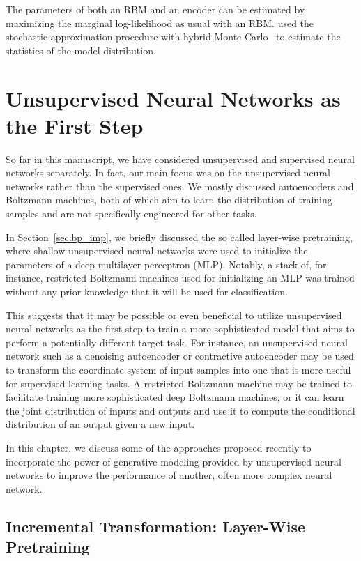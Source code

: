 \documentclass{now}
\begin{document}
The parameters of both an RBM and an encoder can be estimated by maximizing the
marginal log-likelihood as usual with an RBM. \citet{Ngiam2011} used the
stochastic approximation procedure with hybrid Monte Carlo~\citep{Neal1993} to
estimate the statistics of the model distribution.


\chapter{Unsupervised Neural Networks as the First Step}
\label{chap:pretraining}

So far in this manuscript, we have considered unsupervised and supervised neural
networks separately.  In fact, our main focus was on the unsupervised neural
networks rather than the supervised ones. We mostly discussed autoencoders and
Boltzmann machines, both of which aim to learn the distribution of training
samples and are not specifically engineered for other tasks.

In Section~\ref{sec:bp_imp}, we briefly discussed the so called layer-wise
pretraining, where shallow unsupervised neural networks were used to initialize
the parameters of a deep multilayer perceptron (MLP). Notably, a stack of, for
instance, restricted Boltzmann machines used for initializing an MLP was trained
without any prior knowledge that it will be used for classification.

This suggests that it may be possible or even beneficial to utilize unsupervised
neural networks as the first step to train a more sophisticated model that aims
to perform a potentially different target task. For instance, an unsupervised
neural network such as a denoising autoencoder or contractive autoencoder may be
used to transform the coordinate system of input samples into one that is more
useful for supervised learning tasks. A restricted Boltzmann machine may be
trained to facilitate training more sophisticated deep Boltzmann machines, or it
can learn the joint distribution of inputs and outputs and use it to compute the
conditional distribution of an output given a new input.

In this chapter, we discuss some of the approaches proposed recently to
incorporate the power of generative modeling provided by unsupervised neural
networks to improve the performance of another, often more complex neural
network.  


\section{Incremental Transformation: Layer-Wise Pretraining}
\label{sec:layer_wise_pretraining}
\end{document}
